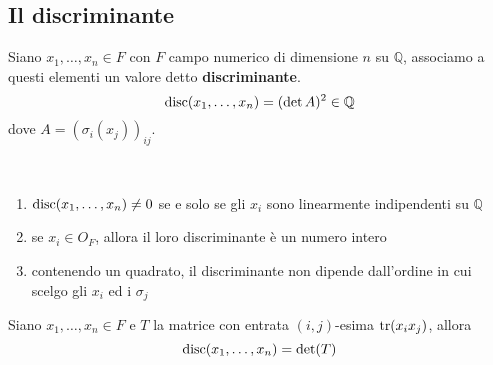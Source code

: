 \subsection{Il discriminante}
\begin{definizione}[Discriminante]
	Siano $x_1,\dots,x_n\in F$ con $F$ campo numerico di dimensione $n$ su $\mathbb{Q}$, associamo a questi elementi un valore detto \textbf{discriminante}.
	\begin{equation*}
	\operatorname{disc}(x_1,\dots,x_n)=(\det A)^2\in\mathbb{Q}
	\end{equation*}
	dove $A=\left(\sigma_i(x_j)\right)_{ij}$.
\end{definizione}
\begin{proposizione}\
	\begin{enumerate}
		\item $\operatorname{disc}(x_1,\dots,x_n)\neq0$ se e solo se gli $x_i$ sono linearmente indipendenti su $\mathbb{Q}$
		\item se $x_i\in O_F$, allora il loro discriminante è un numero intero
		\item contenendo un quadrato, il discriminante non dipende dall'ordine in cui scelgo gli $x_i$ ed i $\sigma_j$
	\end{enumerate}
\end{proposizione}
\begin{proposizione}
	Siano $x_1,\dots,x_n\in F$ e $T$ la matrice con entrata $(i,j)$-esima $\operatorname{tr}(x_ix_j)$, allora
	\begin{equation*}
	\operatorname{disc}(x_1,\dots,x_n)=\det(T)
	\end{equation*}
\end{proposizione}
